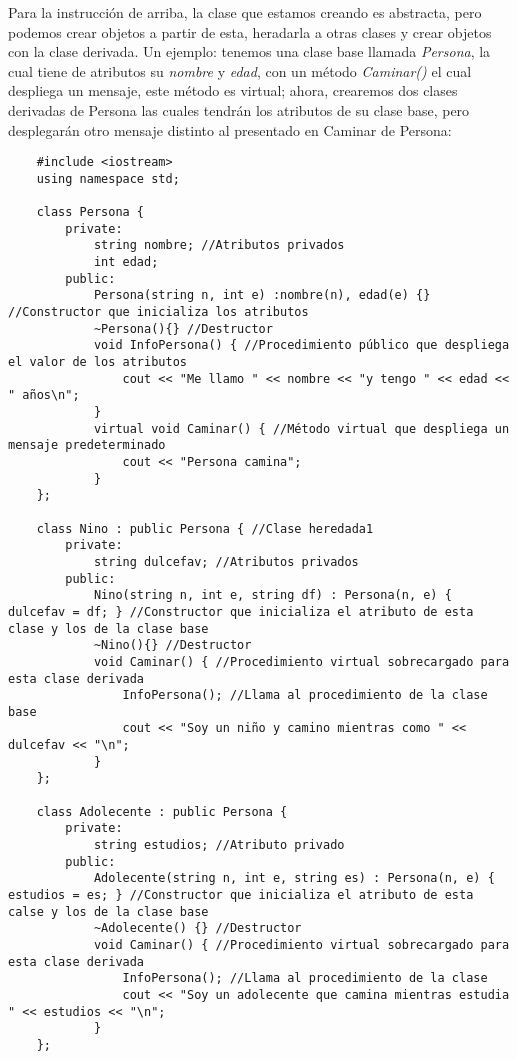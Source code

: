 Para la instrucción de arriba, la clase que estamos creando es abstracta, pero podemos crear objetos a partir de esta, heradarla a otras clases y crear objetos con la clase derivada. Un ejemplo: tenemos una clase base llamada \textit{Persona}, la cual tiene de atributos su \textit{nombre} y \textit{edad}, con un método \textit{Caminar()} el cual despliega un mensaje, este método es virtual; ahora, crearemos dos clases derivadas de Persona las cuales tendrán los atributos de su clase base, pero desplegarán otro mensaje distinto al presentado en Caminar de Persona:
\begin{lstlisting}
    #include <iostream>
    using namespace std;
    
    class Persona {
        private:
            string nombre; //Atributos privados
            int edad;
        public:
            Persona(string n, int e) :nombre(n), edad(e) {} //Constructor que inicializa los atributos
            ~Persona(){} //Destructor
            void InfoPersona() { //Procedimiento público que despliega el valor de los atributos
                cout << "Me llamo " << nombre << "y tengo " << edad << " años\n";
            }
            virtual void Caminar() { //Método virtual que despliega un mensaje predeterminado
                cout << "Persona camina";
            }
    };

    class Nino : public Persona { //Clase heredada1
        private:
            string dulcefav; //Atributos privados
        public:
            Nino(string n, int e, string df) : Persona(n, e) { dulcefav = df; } //Constructor que inicializa el atributo de esta clase y los de la clase base
            ~Nino(){} //Destructor
            void Caminar() { //Procedimiento virtual sobrecargado para esta clase derivada
                InfoPersona(); //Llama al procedimiento de la clase base
                cout << "Soy un niño y camino mientras como " << dulcefav << "\n";
            }
    };

    class Adolecente : public Persona {
        private:
            string estudios; //Atributo privado
        public:
            Adolecente(string n, int e, string es) : Persona(n, e) { estudios = es; } //Constructor que inicializa el atributo de esta calse y los de la clase base
            ~Adolecente() {} //Destructor
            void Caminar() { //Procedimiento virtual sobrecargado para esta clase derivada
                InfoPersona(); //Llama al procedimiento de la clase
                cout << "Soy un adolecente que camina mientras estudia " << estudios << "\n";
            }
    };


\end{lstlisting}
